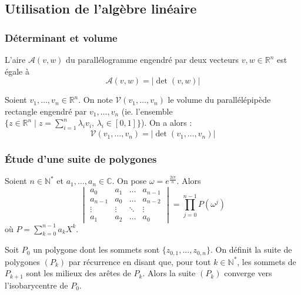   \subsection{Utilisation de l'algèbre linéaire}

  \subsubsection{Déterminant et volume}


  \begin{theorem}
    L'aire $\mathcal{A}(v,w)$ du parallélogramme engendré par deux vecteurs $v, w \in \mathbb{R}^n$ est égale à
    \[ \mathcal{A}(v,w) = \vert \det(v,w) \vert \]
  \end{theorem}

  \begin{corollary}
    Soient $v_1, \dots, v_n \in \mathbb{R}^n$. On note $\mathcal{V}(v_1, \dots, v_n)$ le volume du parallélépipède rectangle engendré par $v_1, \dots, v_n$ (ie. l'ensemble $\{ z \in \mathbb{R}^n \mid z = \sum_{i=1}^n \lambda_i v_i, \, \lambda_i \in [0,1] \}$). On a alors :
    \[ \mathcal{V}(v_1, \dots, v_n) = \vert \det(v_1, \dots, v_n) \vert \]
  \end{corollary}

  \subsubsection{Étude d'une suite de polygones}


  \begin{proposition}
    Soient $n \in \mathbb{N}^*$ et $a_1, \dots, a_n \in \mathbb{C}$. On pose $\omega = e^{\frac{2i\pi}{n}}$. Alors
    \[ \begin{vmatrix} a_0 & a_1 & \dots & a_{n-1} \\ a_{n-1} & a_0 & \dots & a_{n-2}\\ \vdots & \vdots & \ddots & \vdots \\ a_1 & a_2 & \dots & a_0 \end{vmatrix} = \prod_{j=0}^{n-1} P(\omega^j) \]
    où $P = \sum_{k=0}^{n-1} a_k X^k$.
  \end{proposition}


  \begin{application}
    Soit $P_0$ un polygone dont les sommets sont $\{ z_{0,1}, \dots, z_{0,n} \}$. On définit la suite de polygones $(P_k)$ par récurrence en disant que, pour tout $k \in \mathbb{N}^*$, les sommets de $P_{k+1}$ sont les milieux des arêtes de $P_k$.
    \newpar
    Alors la suite $(P_k)$ converge vers l'isobarycentre de $P_0$.
  \end{application}

